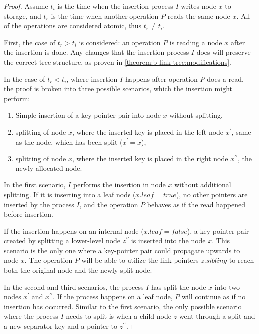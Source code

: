 \begin{proof}
  Assume $t_i$ is the time when the insertion process $I$ writes node $x$ to storage, and $t_r$ is the time when another operation $P$ reads the same node $x$. All of the operations are considered atomic, thus $t_r \neq t_i$.

  First, the case of $t_r > t_i$ is considered: an operation $P$ is reading a node $x$ after the insertion is done. Any changes that the insertion process $I$ does will preserve the correct tree structure, as proven in \cref{theorem:b-link-tree:modifications}.

  In the case of $t_r < t_i$, where insertion $I$ happens after operation $P$ does a read, the proof is broken into three possible scenarios, which the insertion might perform:

  \begin{enumerate}
    \item Simple insertion of a key-pointer pair into node $x$ without splitting,
    \item splitting of node $x$, where the inserted key is placed in the left node $x^\prime$, same as the node, which has been split ($x^\prime = x$),
    \item splitting of node $x$, where the inserted key is placed in the right node $x^{\prime\prime}$, the newly allocated node.
  \end{enumerate}

  In the first scenario, $I$ performs the insertion in node $x$ without additional splitting. If it is inserting into a leaf node ($x.\mathit{leaf} = \mathit{true}$), no other pointers are inserted by the process $I$, and the operation $P$ behaves as if the read happened before insertion.

  If the insertion happens on an internal node ($x.\mathit{leaf} = \mathit{false}$), a key-pointer pair created by splitting a lower-level node $z^{\prime\prime}$ is inserted into the node $x$. This scenario is the only one where a key-pointer pair could propagate upwards to node $x$. The operation $P$ will be able to utilize the link pointers $z.\mathit{sibling}$ to reach both the original node and the newly split node.

  In the second and third scenarios, the process $I$ has split the node $x$ into two nodes $x^\prime$ and $x^{\prime\prime}$. If the process happens on a leaf node, $P$ will continue as if no insertion has occurred. Similar to the first scenario, the only possible scenario where the process $I$ needs to split is when a child node $z$ went through a split and a new separator key and a pointer to $z^{\prime\prime}$.


\end{proof}
